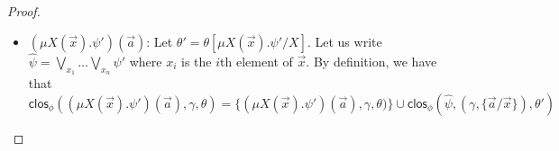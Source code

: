 \documentclass[10pt,a4paper]{article}
\theoremstyle{definition}
\theoremstyle{remark}
\newcommand\new[0]{\reflectbox{\ensuremath{\mathsf{N}}}}
\newcommand\fresh[1]{\new #1.}
\DeclareMathOperator{\supp}{supp}
\newcommand\Ncal{\mathcal{N}}
\newcommand\orb[1][]{\mathcal{O}_{#1}}
\newcommand{\clos}[0]{\mathsf{clos}}
\begin{document}
\begin{proof}
\begin{enumerate}
\begin{itemize}
						\begin{align*}
				\orb[\Ncal](\clos_\phi(\psi, \theta)) 
				&= \bigcup\nolimits_{a \in \Ncal} \orb[\Ncal](\clos_\phi(\psi',(\gamma, \{a/x\}), \theta)) 
				\\
								&\quad\cup \orb[\Ncal]\left(\bigcup\nolimits_{a \notin \Ncal} (a\ b) \cdot\clos_\phi(\psi',(\gamma, \{a/x\}), \theta)\right)
				\cup\{(\psi, \gamma,\theta)\} 
			\end{align*}
			and hence
			\begin{align*}
				|\orb[\Ncal](\clos_\phi(\psi, \gamma,\theta)) |
																&\leq \sum\nolimits_{a \in \Ncal} |\orb[\Ncal](\clos_\phi(\psi',(\gamma, \{a/x\}), \theta))| \\
				&\quad + |\orb[\Ncal \cup \{b\}](\clos_\phi(\psi',(\gamma, \{ a /  x\}), \theta))|+1\\
				&\overset{\text{IH}}{\leq}
				\sum\nolimits_{a \in \Ncal} |\psi'|\cdot m'(\psi',(\gamma, \{a/x\}),\theta) \\
				&\quad + |\psi'|\cdot m'(\psi',(\gamma, \{ a /  x\})\theta)+1
			\end{align*}
			For $a \in \Ncal$, then $m'(\psi',(\gamma, \{a/x\}),\theta) = (|\Ncal| + \|\psi\| - 1)!/|\Ncal|! = m'(\psi,\gamma,\theta)/(|\Ncal|+\|\psi\|)$. 
			For $b \notin \supp(\psi',\gamma,\theta)$, then $m'(\psi',(\gamma, \{\vec a / \vec x\}),\theta) = (|\Ncal| + \|\psi\|) / (|\Ncal| + 1)! = m'(\psi)/(|\Ncal| + 1)$.
			Thus, we obtain:
			\begin{align*}
				|\orb[\Ncal](\clos_\phi(\psi,\gamma, \theta)| 
				&\le 
				\sum\nolimits_{a \in \Ncal} |\psi'|\cdot m'(\psi,(\gamma, \{a/x\}),\theta)/(|\Ncal|+1)\\
				&\quad + |\psi'|\cdot m'(\psi,\gamma,\theta)/(|\Ncal|+1)+1
				\\
				&=|\psi'|\cdot m'(\psi,\gamma,\theta)/(|\Ncal|+1)\cdot (|\Ncal|+1)+1 
				\\
				&=|\psi'|\cdot m'(\psi,\gamma,\theta)+1
				\leq |\psi|\cdot m'(\psi,\gamma,\theta)
			\end{align*}
			A similar argument can be shown for $\bigwedge\nolimits_x \psi'$ and $\fresh{x} \psi'$.
						\item $(\mu X(\vec x).\psi')(\vec a)$: 
			Let $\theta' = \theta[\mu X(\vec x).\psi' / X]$.
									Let us write $\hat \psi = \bigvee\nolimits_{x_1}\dots\bigvee\nolimits_{x_n}\psi'$ where $x_i$ is the $i$th element of $\vec x$.
			By definition, we have that
			\[
			\clos_\phi((\mu X(\vec x).\psi')(\vec a), \gamma, \theta) = \{(\mu X(\vec x).\psi')(\vec a), \gamma, \theta)\} \cup \clos_\phi(\hat \psi, (\gamma, \{\vec a / \vec x\}), \theta')
\]
\end{itemize}
\end{enumerate}
\end{proof}
\end{document}
